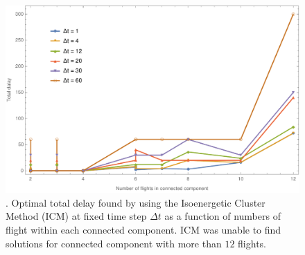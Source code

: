 \begin{figure}
  \includegraphics[width=\columnwidth]{pics/qubo_icm/qubo_icm_2.pdf}
  \caption{\label{fig:icm2}. Optimal total delay found by using the Isoenergetic
  Cluster Method (ICM) at fixed time step $\Delta t$ as a function of numbers of
  flight within each connected component. ICM was unable to find solutions for connected
  component with more than $12$ flights.}
\end{figure}
